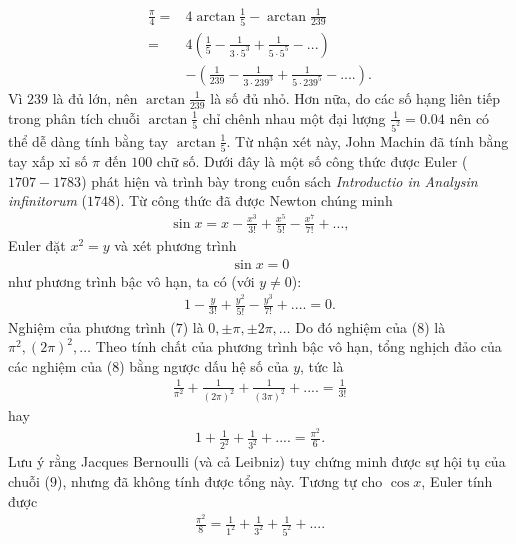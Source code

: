 \begin{multicols}{2}
\begin{align*}
			\!\!\!\!\!\!\frac{\pi }{4} = &4\arctan \frac{1}{5} - \arctan \frac{1}{{239}} \\
			= &4\left( {\frac{1}{5} - \frac{1}{{3 \cdot {5^3}}} + \frac{1}{{5 \cdot {5^5}}} - ...} \right) \\
			&-\!\! \left(\!\! {\frac{1}{{239}} \!-\! \frac{1}{{3 \!\cdot\! {{239}^3}}} \!+\! \frac{1}{{5 \!\cdot\! {{239}^5}}} \!-\! ....}\!\! \right)\!\!. \tag{$6$}
	\end{align*}
	Vì $239$ là đủ lớn, nên $\arctan\frac{1}{239}$ là số đủ nhỏ. Hơn nữa, do các số hạng liên tiếp trong phân tích chuỗi $\arctan\frac{1}{5}$ chỉ chênh nhau một đại lượng $\frac{1}{5^2} = 0.04$ nên có thể dễ dàng tính bằng tay $\arctan \frac{1}{5}$. Từ nhận xét này, John Machin đã tính bằng tay xấp xỉ số $\pi$ đến $100$ chữ số. 
	\vskip 0.1cm
	Dưới đây là một số công thức được Euler ($1707-1783$) phát hiện và trình bày trong cuốn sách \textit{Introductio in Analysin infinitorum} ($1748$).
	\vskip 0.1cm
	Từ công thức đã được Newton chúng minh
	\begin{align*}
		\sin x = x - \frac{{{x^3}}}{{3!}} + \frac{{{x^5}}}{{5!}} - \frac{{{x^7}}}{{7!}} + ...,
	\end{align*}
	Euler đặt $x^2 = y$ và xét phương trình 
	\begin{align*}
		\sin x = 0 \tag{$7$}
	\end{align*}
	như phương trình bậc vô hạn, ta có (với $y \ne 0 $):
	\begin{align*}
		1 - \frac{y}{{3!}} + \frac{{{y^2}}}{{5!}} - \frac{{{y^3}}}{{7!}} + .... = 0. \tag{$8$}
	\end{align*}
	Nghiệm của phương trình ($7$) là $0, \pm \pi, \pm 2\pi, \ldots$  Do đó nghiệm của ($8$) là $\pi^2, (2\pi)^2, \ldots$
	\vskip 0.1cm  
	Theo tính chất của phương trình bậc vô hạn, tổng nghịch đảo của các nghiệm của ($8$) bằng ngược dấu hệ số của $y$, tức là
	\begin{align*}
		\frac{1}{{{\pi ^2}}} + \frac{1}{{{{\left( {2\pi } \right)}^2}}} + \frac{1}{{{{\left( {3\pi } \right)}^2}}} + .... = \frac{1}{{3!}}
	\end{align*}
	hay 
	\begin{align*}
		1 + \frac{1}{{{2^2}}} + \frac{1}{{{3^2}}} + .... = \frac{{{\pi ^2}}}{6}. \tag{$9$}
	\end{align*}
	Lưu ý rằng Jacques Bernoulli (và cả Leibniz) tuy chứng minh được sự hội tụ của chuỗi ($9$), nhưng đã không tính được tổng này. 
	\vskip 0.1cm
	Tương tự cho $\cos x$,  Euler tính được
	\begin{align*}
		\frac{{{\pi ^2}}}{8} = \frac{1}{{{1^2}}} + \frac{1}{{{3^2}}} + \frac{1}{{{5^2}}} + .... \tag{$10$}

\end{align*}
\end{multicols}
